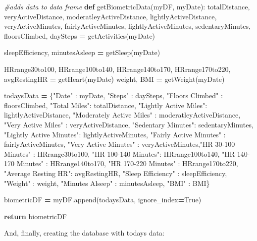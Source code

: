 \documentclass[]{book}
\newenvironment{Shaded}{\begin{snugshade}}{\end{snugshade}}
\newcommand{\KeywordTok}[1]{\textcolor[rgb]{0.13,0.29,0.53}{\textbf{#1}}}
\newcommand{\StringTok}[1]{\textcolor[rgb]{0.31,0.60,0.02}{#1}}
\newcommand{\CommentTok}[1]{\textcolor[rgb]{0.56,0.35,0.01}{\textit{#1}}}
\newcommand{\VariableTok}[1]{\textcolor[rgb]{0.00,0.00,0.00}{#1}}
\newcommand{\ControlFlowTok}[1]{\textcolor[rgb]{0.13,0.29,0.53}{\textbf{#1}}}
\newcommand{\OperatorTok}[1]{\textcolor[rgb]{0.81,0.36,0.00}{\textbf{#1}}}
\newcommand{\NormalTok}[1]{#1}
\begin{document}
\begin{Shaded}
\begin{Highlighting}[]
\CommentTok{#adds data to data frame}
\KeywordTok{def}\NormalTok{ getBiometricData(myDF, myDate):}
\NormalTok{    totalDistance, veryActiveDistance, moderatleyActiveDistance, lightlyActiveDistance, veryActiveMinutes, fairlyActiveMinutes, lightlyActiveMinutes, sedentaryMinutes, floorsClimbed, daySteps }\OperatorTok{=}\NormalTok{ getActivities(myDate)}
    
\NormalTok{    sleepEfficiency, minutesAsleep }\OperatorTok{=}\NormalTok{ getSleep(myDate)}
    
\NormalTok{    HRrange30to100, HRrange100to140, HRrange140to170, HRrange170to220, avgRestingHR }\OperatorTok{=}\NormalTok{ getHeart(myDate)}
\NormalTok{    weight, BMI }\OperatorTok{=}\NormalTok{ getWeight(myDate)}
    
\NormalTok{    todaysData }\OperatorTok{=}\NormalTok{ \{}\StringTok{"Date"}\NormalTok{ : myDate, }\StringTok{"Steps"}\NormalTok{ : daySteps, }\StringTok{"Floors Climbed"}\NormalTok{ : floorsClimbed, }\StringTok{"Total Miles"}\NormalTok{: totalDistance, }\StringTok{"Lightly Active Miles"}\NormalTok{: lightlyActiveDistance, }\StringTok{"Moderately Active Miles"}\NormalTok{ : moderatleyActiveDistance, }\StringTok{"Very Active Miles"}\NormalTok{ : veryActiveDistance, }\StringTok{"Sedentary Minutes"}\NormalTok{: sedentaryMinutes, }\StringTok{"Lightly Active Minutes"}\NormalTok{: lightlyActiveMinutes, }\StringTok{"Fairly Active Minutes"}\NormalTok{ : fairlyActiveMinutes, }\StringTok{"Very Active Minutes"}\NormalTok{ : veryActiveMinutes,}\StringTok{"HR 30-100 Minutes"}\NormalTok{ : HRrange30to100, }\StringTok{"HR 100-140 Minutes"}\NormalTok{: HRrange100to140, }\StringTok{"HR 140-170 Minutes"}\NormalTok{ : HRrange140to170, }\StringTok{"HR 170-220 Minutes"}\NormalTok{ : HRrange170to220, }\StringTok{"Average Resting HR"}\NormalTok{: avgRestingHR, }\StringTok{"Sleep Efficiency"}\NormalTok{ : sleepEfficiency, }\StringTok{"Weight"}\NormalTok{ : weight, }\StringTok{"Minutes Alseep"}\NormalTok{ : minutesAsleep, }\StringTok{"BMI"}\NormalTok{ : BMI\}}

\NormalTok{    biometricDF }\OperatorTok{=}\NormalTok{ myDF.append(todaysData, ignore_index}\OperatorTok{=}\VariableTok{True}\NormalTok{)}

    \ControlFlowTok{return}\NormalTok{ biometricDF}
\end{Highlighting}
\end{Shaded}

And, finally, creating the database with todays data:
\end{document}
